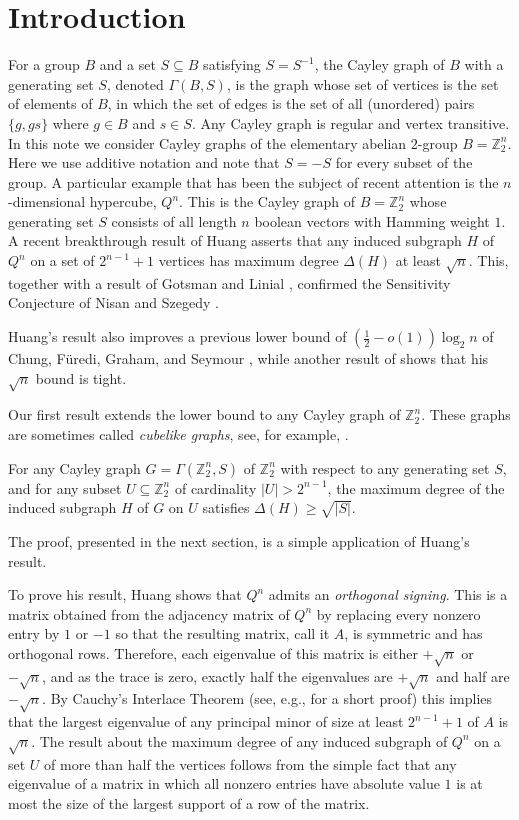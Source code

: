 \section{Introduction} \label{sec: intro}
For a group $B$ and a set $S \subseteq B$ satisfying
$S=S^{-1}$, the Cayley graph of  
$B$ with a generating set $S$, denoted $\Gamma(B, S)$, is  
the graph whose set of vertices 
is the set of elements of $B$, in which the set of edges is the 
set of all (unordered) pairs $\{g, gs\}$ where $g \in B$ and $s \in S$.
Any Cayley graph is regular and vertex transitive. In this note we  
consider Cayley graphs of the elementary abelian $2$-group 
$B = \mathbb{Z}_{2}^{n}$. Here we use additive notation and note that
$S=-S$ for every subset of the group. A particular example that 
has been the subject of recent attention is the $n$-dimensional hypercube, 
$Q^{n}$. This is the Cayley graph of $B = \mathbb{Z}_{2}^{n}$ whose 
generating set $S$ consists of all length $n$ boolean vectors 
with Hamming weight $1$. A recent breakthrough 
result of Huang \cite{Hu} asserts that any 
induced subgraph $H$ of $Q^{n}$ on a set of $2^{n-1}+1$ vertices
has maximum degree $\Delta(H)$ at least $\sqrt{n}$.
This, together with a result of Gotsman and Linial \cite{GL}, 
confirmed the Sensitivity Conjecture of Nisan and Szegedy \cite{NS}.

Huang's result also improves a previous lower bound of
$(\frac{1}{2} - o(1))\log_2{n}$ of Chung, F{\"u}redi, Graham, and
Seymour \cite{CFGS}, while another result of \cite{CFGS} shows that
his $\sqrt n$ bound is tight.

Our first result extends the lower bound to any Cayley graph
of ${\mathbb{Z}_{2}^{n}}$. 
These graphs are sometimes called \emph{cubelike graphs}, see, for example,
\cite{MPRR}.
\begin{theo}
\label{t11}
For any Cayley graph $G=\Gamma(\mathbb{Z}_{2}^{n}, S)$
of $\mathbb{Z}_{2}^{n}$ with respect to any
generating set $S$, and for
any subset $U \subseteq \mathbb{Z}_{2}^{n}$
of cardinality $|U| > 2^{n-1}$, the maximum degree of the induced subgraph
$H$ of $G$ on $U$ satisfies $\Delta(H) \geq \sqrt{|S|}.$
\end{theo}
The proof, presented in the next section, is a simple application of
Huang's result. 

To prove his result, Huang shows that $Q^n$ admits
an {\em orthogonal signing}. This is a matrix obtained from the adjacency
matrix of $Q^n$ by replacing every nonzero entry by $1$ or $-1$ so that
the resulting matrix, call it $A$,
is symmetric and has orthogonal rows. Therefore, each
eigenvalue of this matrix is either $+\sqrt n$ or $-\sqrt n$, and as the
trace is zero, exactly half the eigenvalues are $+\sqrt n$ and half are
$-\sqrt n$. By Cauchy's Interlace Theorem (see, e.g., \cite{Hw} for 
a short proof) this implies that the largest eigenvalue of any principal
minor of size at least $2^{n-1}+1$ of $A$ is $\sqrt n$. The result
about the maximum degree of any induced subgraph of $Q^n$ on a set
$U$ of more than half the vertices follows from the simple fact that 
any eigenvalue of a matrix in which all nonzero entries have absolute
value $1$ is at most the size of the largest support of a row  of the
matrix. 

